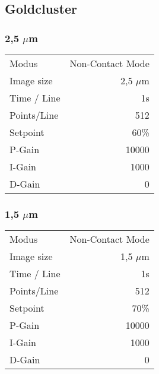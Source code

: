 \subsection*{Goldcluster}

\subsubsection*{2,5 $\mu$m}
\begin{center}
    \centering
    \begin{tabular}{l|r}
        Modus & Non-Contact Mode\\
        Image size & 2,5 $\mu$m \\
        Time / Line & 1s \\
        Points/Line & 512\\
        Setpoint & 60\% \\
        P-Gain & 10000 \\
        I-Gain & 1000 \\
        D-Gain & 0 \\
        
    \end{tabular}
\end{center}

\subsubsection*{1,5 $\mu$m}
\begin{center}
    \centering
    \begin{tabular}{l|r}
        Modus & Non-Contact Mode\\
        Image size & 1,5 $\mu$m \\
        Time / Line & 1s \\
        Points/Line & 512\\
        Setpoint & 70\% \\
        P-Gain & 10000 \\
        I-Gain & 1000 \\
        D-Gain & 0 \\
        
    \end{tabular}
\end{center}

